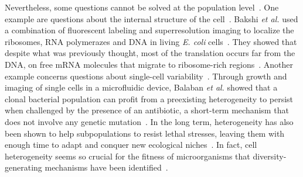 Nevertheless, some questions cannot be solved at the population level~\cite{davey_flow_1996,bakshi_superresolution_2012,balaban_bacterial_2004}.
One example are questions about the internal structure of the cell~\cite{bakshi_superresolution_2012}.
Bakshi \textit{et al.} used a combination of fluorescent labeling and superresolution imaging to localize the ribosomes, RNA polymerazes and DNA in living \textit{E. coli} cells~\cite{bakshi_superresolution_2012}.
They showed that despite what was previously thought, most of the translation occurs far from the DNA, on free mRNA molecules that migrate to ribosome-rich regions~\cite{bakshi_superresolution_2012}.
Another example concerns questions about single-cell variability~\cite{balaban_bacterial_2004,booth_stress_2002,sumner_phenotypic_2002}.
Through growth and imaging of single cells in a microfluidic device, Balaban \textit{et al.} showed that a clonal bacterial population can profit from a preexisting heterogeneity to persist when challenged by the presence of an antibiotic, a short-term mechanism that does not involve any genetic mutation~\cite{balaban_bacterial_2004}.
In the long term, heterogeneity has also been shown to help subpopulations to resist lethal stresses, leaving them with enough time to adapt and conquer new ecological niches~\cite{booth_stress_2002,sumner_phenotypic_2002}.
In fact, cell heterogeneity seems so crucial for the fitness of microorganisms that diversity-generating mechanisms have been identified~\cite{true_yeast_2000,fraser_noise_2004,raser_control_2004}.

